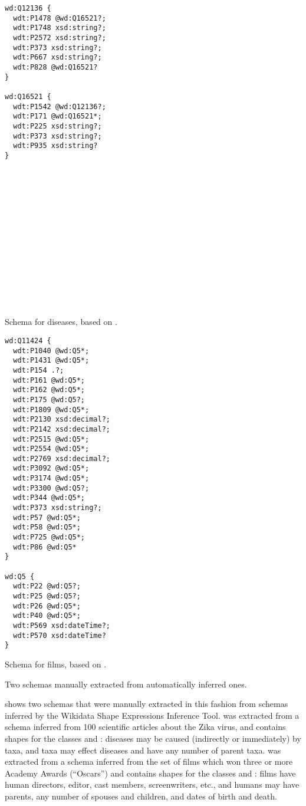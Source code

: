 \begin{lstfloat}[ht]
\begin{sublstfloat}[t]{0.45\textwidth}
\begin{lstlisting}[language=sparql,showlines=true]
wd:Q12136 {
  wdt:P1478 @wd:Q16521?;
  wdt:P1748 xsd:string?;
  wdt:P2572 xsd:string?;
  wdt:P373 xsd:string?;
  wdt:P667 xsd:string?;
  wdt:P828 @wd:Q16521?
}

wd:Q16521 {
  wdt:P1542 @wd:Q12136?;
  wdt:P171 @wd:Q16521*;
  wdt:P225 xsd:string?;
  wdt:P373 xsd:string?;
  wdt:P935 xsd:string?
}
















\end{lstlisting}
\caption{Schema for diseases, based on .}
\label{listing:zika}
\end{sublstfloat}
\begin{sublstfloat}[t]{0.45\textwidth}
\begin{lstlisting}[language=sparql]
wd:Q11424 {
  wdt:P1040 @wd:Q5*;
  wdt:P1431 @wd:Q5*;
  wdt:P154 .?;
  wdt:P161 @wd:Q5*;
  wdt:P162 @wd:Q5*;
  wdt:P175 @wd:Q5?;
  wdt:P1809 @wd:Q5*;
  wdt:P2130 xsd:decimal?;
  wdt:P2142 xsd:decimal?;
  wdt:P2515 @wd:Q5*;
  wdt:P2554 @wd:Q5*;
  wdt:P2769 xsd:decimal?;
  wdt:P3092 @wd:Q5*;
  wdt:P3174 @wd:Q5*;
  wdt:P3300 @wd:Q5?;
  wdt:P344 @wd:Q5*;
  wdt:P373 xsd:string?;
  wdt:P57 @wd:Q5*;
  wdt:P58 @wd:Q5*;
  wdt:P725 @wd:Q5*;
  wdt:P86 @wd:Q5*
}

wd:Q5 {
  wdt:P22 @wd:Q5?;
  wdt:P25 @wd:Q5?;
  wdt:P26 @wd:Q5*;
  wdt:P40 @wd:Q5*;
  wdt:P569 xsd:dateTime?;
  wdt:P570 xsd:dateTime?
}
\end{lstlisting}
\caption{Schema for films, based on .}
\label{listing:films}
\end{sublstfloat}
\caption{Two schemas manually extracted from automatically inferred ones.}
\label{listing:extracted}
\end{lstfloat}

 shows two schemas that were manually extracted in this fashion
from schemas inferred by the Wikidata Shape Expressions Inference Tool.
 was extracted from a schema
inferred from 100 scientific articles about the Zika virus,
and contains shapes for the classes  and :
diseases may be caused (indirectly or immediately) by taxa,
and taxa may effect diseases and have any number of parent taxa.
 was extracted from a schema
inferred from the set of films which won three or more Academy Awards (“Oscars”) %
and contains shapes for the classes  and :
films have human directors, editor, cast members, screenwriters, etc.,
and humans may have parents, any number of spouses and children, and dates of birth and death.

